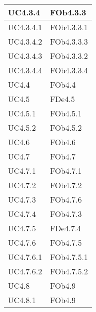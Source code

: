 \begin{longtable}{|l|p{4cm}|}
\hline
		UC4.3.4 & FOb4.3.3 \linebreak   \\
\hline
		UC4.3.4.1 & FOb4.3.3.1 \linebreak   \\
\hline
		UC4.3.4.2 & FOb4.3.3.3 \linebreak   \\
\hline
		UC4.3.4.3 & FOb4.3.3.2 \linebreak   \\
\hline
		UC4.3.4.4 & FOb4.3.3.4 \linebreak   \\
\hline
		UC4.4 & FOb4.4 \linebreak   \\
\hline
		UC4.5 & FDe4.5 \linebreak   \\
\hline
		UC4.5.1 & FOb4.5.1 \linebreak   \\
\hline
		UC4.5.2 & FOb4.5.2 \linebreak   \\
\hline
		UC4.6 & FOb4.6 \linebreak   \\
\hline
		UC4.7 & FOb4.7 \linebreak   \\
\hline
		UC4.7.1 & FOb4.7.1 \linebreak   \\
\hline
		UC4.7.2 & FOb4.7.2 \linebreak   \\
\hline
		UC4.7.3 & FOb4.7.6 \linebreak   \\
\hline
		UC4.7.4 & FOb4.7.3 \linebreak   \\
\hline
		UC4.7.5 & FDe4.7.4 \linebreak   \\
\hline
		UC4.7.6 & FOb4.7.5 \linebreak   \\
\hline
		UC4.7.6.1 & FOb4.7.5.1 \linebreak   \\
\hline
		UC4.7.6.2 & FOb4.7.5.2 \linebreak   \\
\hline
		UC4.8 & FOb4.9 \linebreak   \\
\hline
		UC4.8.1 & FOb4.9 \linebreak   \\

\end{longtable}
